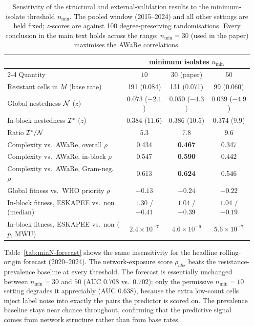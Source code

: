 \begin{table}[htbp]
\centering
\caption{Sensitivity of the structural and external-validation results to the minimum-isolate
threshold $n_{\min}$. The pooled window (2015--2024) and all other settings are held fixed;
$z$-scores are against \num{100} degree-preserving randomisations. Every conclusion in the main text
holds across the range; $n_{\min}=30$ (used in the paper) maximises the AWaRe correlations.}
\label{tab:minN-structure}
\small
\begin{tabular}{l ccc}
\toprule
 & \multicolumn{3}{c}{minimum isolates $n_{\min}$} \\
\cmidrule(lr){2-4}
Quantity & $10$ & $30$ (paper) & $50$ \\
\midrule
Resistant cells in $M$ (base rate)          & 191 (0.084) & 131 (0.071) & 99 (0.060) \\
\addlinespace[2pt]
Global nestedness $\mathcal{N}$ ($z$)                 & 0.073 ($-2.1$) & 0.050 ($-4.3$) & 0.039 ($-4.9$) \\
In-block nestedness $\mathcal{I}^\ast$ ($z$)          & 0.384 ($11.6$) & 0.386 ($10.5$) & 0.374 ($9.9$) \\
Ratio $\mathcal{I}^\ast/\mathcal{N}$                           & 5.3 & 7.8 & 9.6 \\
\addlinespace[2pt]
Complexity vs.\ AWaRe, overall $\rho$        & 0.434 & \textbf{0.467} & 0.347 \\
Complexity vs.\ AWaRe, in-block $\rho$       & 0.547 & \textbf{0.590} & 0.442 \\
Complexity vs.\ AWaRe, Gram-neg.\ $\rho$     & 0.613 & \textbf{0.624} & 0.546 \\
\addlinespace[2pt]
Global fitness vs.\ WHO priority $\rho$      & $-0.13$ & $-0.24$ & $-0.22$ \\
In-block fitness, ESKAPEE vs.\ non (median)  & $1.30$ / $-0.41$ & $1.04$ / $-0.39$ & $1.04$ / $-0.19$ \\
In-block fitness, ESKAPEE vs.\ non ($p$, MWU)& $2.4\times10^{-7}$ & $4.6\times10^{-6}$ & $5.6\times10^{-7}$ \\
\bottomrule
\end{tabular}
\end{table}

Table~\ref{tab:minN-forecast} shows the same insensitivity for the headline rolling-origin forecast
(2020--2024). The network-exposure score $\rho_{abx}$ beats the resistance-prevalence baseline at
every threshold. The forecast is essentially unchanged between $n_{\min}=30$ and $50$
(AUC $0.708$ vs.\ $0.702$); only the permissive $n_{\min}=10$ setting degrades it appreciably
(AUC $0.638$), because the extra low-count cells inject label noise into exactly the pairs the
predictor is scored on. The prevalence baseline stays near chance throughout, confirming that the
predictive signal comes from network structure rather than from base rates.

